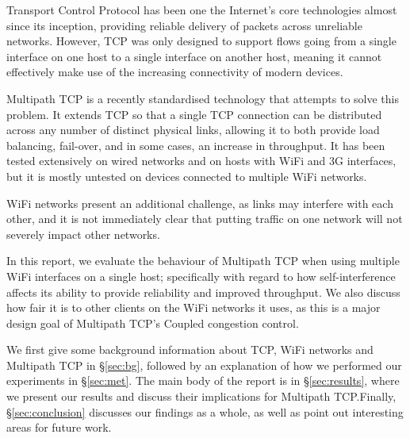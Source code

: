 Transport Control Protocol has been one the Internet's core technologies almost
since its inception, providing reliable delivery of packets across unreliable
networks. However, TCP was only designed to support flows going from a single
interface on one host to a single interface on another host, meaning it cannot
effectively make use of the increasing connectivity of modern devices.

Multipath TCP is a recently standardised technology that attempts to solve this
problem. It extends TCP so that a single TCP connection can be distributed
across any number of distinct physical links, allowing it to both provide load
balancing, fail-over, and in some cases, an increase in throughput. It has been
tested extensively on wired networks and on hosts with WiFi and 3G interfaces,
but it is mostly untested on devices connected to multiple WiFi networks.

WiFi networks present an additional challenge, as links may interfere with each
other, and it is not immediately clear that putting traffic on one network will
not severely impact other networks.

In this report, we evaluate the behaviour of Multipath TCP when using multiple
WiFi interfaces on a single host; specifically with regard to how
self-interference affects its ability to provide reliability and improved
throughput. We also discuss how fair it is to other clients on the WiFi networks
it uses, as this is a major design goal of Multipath TCP's Coupled congestion
control.

We first give some background information about TCP, WiFi networks and Multipath
TCP in \S\ref{sec:bg}, followed by an explanation of how we performed our
experiments in \S\ref{sec:met}. The main body of the report is in
\S\ref{sec:results}, where we present our results and discuss their implications
for Multipath TCP.\@ Finally, \S\ref{sec:conclusion} discusses our findings as a
whole, as well as point out interesting areas for future work.
